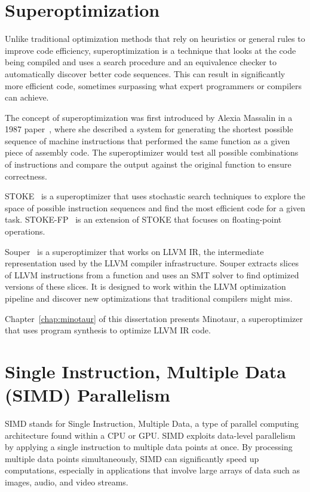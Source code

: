 \section{Superoptimization}
\label{sec:superoptimization}


Unlike traditional optimization methods that rely on heuristics or
general rules to improve code efficiency, superoptimization is a
technique that looks at the code being compiled and uses a search
procedure and an equivalence checker to automatically discover better
code sequences.
%
This can result in significantly more efficient code, sometimes
surpassing what expert programmers or compilers can achieve.

The concept of superoptimization was first introduced by Alexia
Massalin in a 1987 paper~\cite{massalin}, where she described a system
for generating the shortest possible sequence of machine instructions
that performed the same function as a given piece of assembly code.
The superoptimizer would test all possible combinations of
instructions and compare the output against the original function to
ensure correctness.

STOKE~\cite{stoke} is a superoptimizer that uses stochastic search
techniques to explore the space of possible instruction sequences and
find the most efficient code for a given task.
STOKE-FP~\cite{stoke-fp} is an extension of STOKE that focuses on
floating-point operations.

Souper~\cite{souper} is a superoptimizer that works on LLVM IR, the
intermediate representation used by the LLVM compiler infrastructure.
Souper extracts slices of LLVM instructions from a function and uses
an SMT solver to find optimized versions of these slices. It is
designed to work within the LLVM optimization pipeline and discover
new optimizations that traditional compilers might miss.

Chapter~\ref{chap:minotaur} of this dissertation presents Minotaur, a
superoptimizer that uses program synthesis to optimize LLVM IR code.

\section{Single Instruction, Multiple Data (SIMD) Parallelism}
\label{sec:simd}

SIMD stands for Single Instruction, Multiple Data, a type of parallel
computing architecture found within a CPU or GPU. SIMD exploits
data-level parallelism by applying a single instruction to multiple
data points at once.
%
By processing multiple data points simultaneously, SIMD can
significantly speed up computations, especially in applications that
involve large arrays of data such as images, audio, and video streams.

